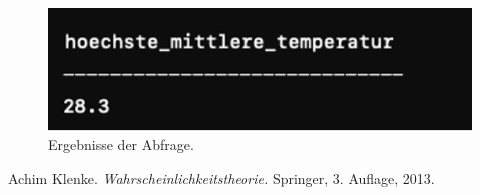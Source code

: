 \documentclass[a4paper,12pt]{article}
\begin{document}
\begin{figure}[h!]
    \centering
\includegraphics[width=\textwidth]{Comet_Snap_3.png}
    \caption{Ergebnisse der Abfrage.}
    \label{fig:example}
\end{figure}


\newpage

\begin{thebibliography}{9}
    Achim Klenke. \textit{Wahrscheinlichkeitstheorie.} Springer, 3. Auflage, 2013.
\end{thebibliography}
\end{document}
